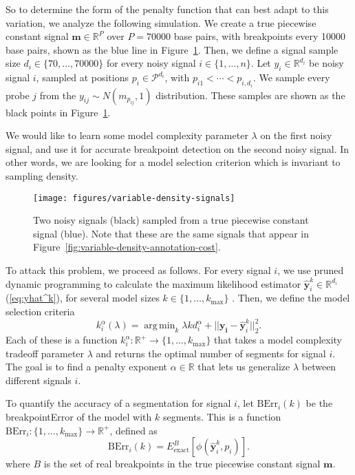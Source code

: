 \documentclass{jsfds} %
\DeclareMathOperator*{\argmin}{arg\,min}
\newcommand{\RR}{\mathbb{R}}
\begin{document}
So to determine the form of the penalty function that can best adapt
to this variation, we analyze the following simulation. We create a
true piecewise constant signal $\mathbf m\in\RR^P$ over $P=70000$ base
pairs, with breakpoints every 10000 base pairs, shown as the blue line
in Figure~\ref{fig:variable-density-signals}. Then, we define a signal
sample size $d_i\in\{70,\dots,70000\}$ for every noisy signal
$i\in\{1,\dots,n\}$. Let $y_i\in\RR^{d_i}$ be noisy signal $i$,
sampled at positions $p_i\in\mathcal P^{d_i}$, with
$p_{i1}<\cdots<p_{i,d_i}$. We sample every probe $j$ from the
$y_{ij}\sim N(m_{p_{ij}},1)$ distribution. These samples are shown as
the black points in Figure~\ref{fig:variable-density-signals}.

We would like to learn some model complexity parameter $\lambda$ on
the first noisy signal, and use it for accurate breakpoint detection
on the second noisy signal. In other words, we are looking for a model
selection criterion which is invariant to sampling density. 

\begin{figure}[H]
\texttt{[image: figures/variable-density-signals]}
%
\vskip -0.3cm
  \caption{Two noisy signals (black) sampled from
  a true piecewise constant signal (blue). Note that these are the
  same signals that appear in
  Figure~\ref{fig:variable-density-annotation-cost}.}
\label{fig:variable-density-signals}
\end{figure}

\newpage


To attack this problem, we proceed as follows. For every signal $i$,
we use pruned dynamic programming to calculate the maximum likelihood
estimator $\mathbf{\hat y}^k_i\in\RR^{d_i}$ (\ref{eq:yhat^k}), for several model sizes
$k\in\{1,\dots,k_{\text{max}}\}$ \citep{pruned-dp}. Then, we define
the model selection criteria
\begin{equation}
  \label{eq:kstar_density}
  k^\alpha_i(\lambda) =\argmin_k \lambda k d_i^\alpha + 
  ||\mathbf{y_i}-\mathbf{\hat y}^k_i||_2^2.
\end{equation}
Each of these is a function $k_i^\alpha:\RR^+\rightarrow
\{1,\dots,k_{\text{max}}\}$ that takes a model complexity tradeoff
parameter $\lambda$ and returns the optimal number of segments for
signal $i$. The goal is to find a penalty exponent $\alpha\in\RR$ that
lets us generalize $\lambda$ between different signals $i$.


To quantify the accuracy of a segmentation for signal $i$, let
$\text{BErr}_i(k)$ be the breakpointError of the model with
$k$ segments. This is a function
$\text{BErr}_i:\{1,\dots,k_{\text{max}}\}\rightarrow\RR^+$, defined as
\begin{equation}
  \label{eq:berr}
  \text{BErr}_i(k) = E_{\text{exact}}^{B}\left[
\phi(\mathbf{\hat y}_i^k,p_i)
\right].
\end{equation}
where $B$ is the set of real breakpoints in the true piecewise constant
signal $\mathbf m$.
\end{document}

